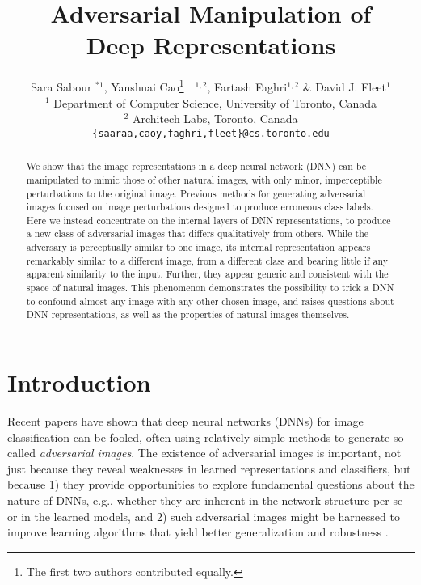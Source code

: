 \documentclass{article} %
\title{Adversarial Manipulation of \\Deep Representations}
\author{
    Sara Sabour $^{* 1}$, Yanshuai Cao\thanks{The first two authors contributed 
    equally.}~~$^{1,2}$, Fartash Faghri$^{1,2}$ \& David J.  Fleet$^1$\\
    $^1$ Department of Computer Science,
    University of Toronto, Canada\\
    $^2$ Architech Labs, Toronto, Canada\\
    \texttt{\{saaraa,caoy,faghri,fleet\}@cs.toronto.edu}    }
\begin{document}
\maketitle

\begin{abstract}
\vspace*{-0.1cm}
We show that the image representations in a deep neural network 
(DNN) can be manipulated to mimic those of other natural images, 
with only minor, imperceptible perturbations to the original image. 
Previous methods for generating adversarial images focused on image 
perturbations designed to produce erroneous class labels.  Here we
instead concentrate on the internal layers of DNN representations, 
to produce a new class of adversarial images that differs qualitatively 
from others. While the adversary is perceptually similar to one image, 
its internal representation appears remarkably similar to a different 
image, from a different class and bearing little if any apparent 
similarity to the input.  Further, they appear generic and consistent 
with the space of natural images.  This phenomenon demonstrates the 
possibility to trick a DNN to confound almost any image with any other 
chosen image, and raises questions about DNN representations, as well 
as the properties of natural images themselves.

\vspace*{-0.1cm}
\end{abstract}

\section{Introduction}\vspace*{-0.1cm}%

Recent papers have shown that deep neural networks (DNNs) for image 
classification can be fooled, often using relatively simple methods to
generate so-called {\em adversarial images}\citep{FawziEtalICLR2015, GoodfellowEtalICLR2015, GuRigazioNIPSWorkshop2014, 
NguyenEtAlCVPR2015, SzegedyElatICLR2014, Tabacof2015exploring}. 
The existence of adversarial images is important, not 
just because they reveal weaknesses in learned representations 
and classifiers, but because 1) they provide opportunities to explore 
fundamental questions about the nature of DNNs, e.g., whether they are 
inherent in the network structure per se or in the learned models, and 
2) such adversarial images might be harnessed to improve learning 
algorithms that yield better generalization and robustness 
\citep{GoodfellowEtalICLR2015, GuRigazioNIPSWorkshop2014}.
\end{document}
